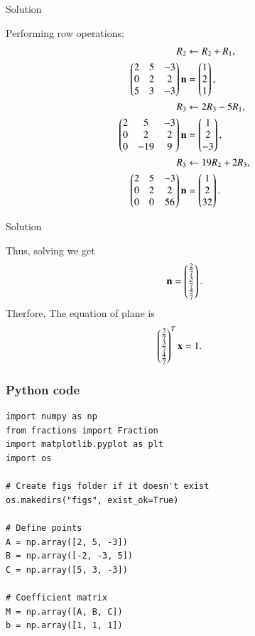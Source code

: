 \documentclass{beamer}
\begin{document}
\begin{frame}{Solution}

Performing row operations:
\begin{align}
R_2 &\leftarrow R_2 + R_1, \\
\begin{pmatrix}2 & 5 & -3 \\ 0 & 2 & 2 \\ 5 & 3 & -3\end{pmatrix}\mathbf{n}
&= \begin{pmatrix}1 \\ 2 \\ 1\end{pmatrix},\\
R_3 &\leftarrow 2R_3 - 5R_1, \\
\begin{pmatrix}2 & 5 & -3 \\ 0 & 2 & 2 \\ 0 & -19 & 9\end{pmatrix}\mathbf{n}
&= \begin{pmatrix}1 \\ 2 \\ -3\end{pmatrix},\\
R_3 &\leftarrow 19R_2 + 2R_3, \\
\begin{pmatrix}2 & 5 & -3 \\ 0 & 2 & 2 \\ 0 & 0 & 56\end{pmatrix}\mathbf{n}
&= \begin{pmatrix}1 \\ 2 \\ 32\end{pmatrix}.
\end{align}
\end{frame}
\begin{frame}{Solution}

Thus, solving we get
\begin{align}
\mathbf{n} = \begin{pmatrix}\tfrac{2}{7} \\ \tfrac{3}{7} \\ \tfrac{4}{7}\end{pmatrix}.
\end{align}
Therfore,
The equation of plane is
\begin{align}
	\begin{pmatrix}\tfrac{2}{7} \\ \tfrac{3}{7} \\ \tfrac{4}{7}\end{pmatrix}^T\mathbf{x} &= 1.
\end{align}
\end{frame}
\begin{frame}[fragile]                            
\frametitle{Python code  }                
\begin{lstlisting}
import numpy as np
from fractions import Fraction
import matplotlib.pyplot as plt
import os

# Create figs folder if it doesn't exist
os.makedirs("figs", exist_ok=True)

# Define points
A = np.array([2, 5, -3])
B = np.array([-2, -3, 5])
C = np.array([5, 3, -3])

# Coefficient matrix
M = np.array([A, B, C])
b = np.array([1, 1, 1])
\end{lstlisting}
\end{frame}
\end{document}
